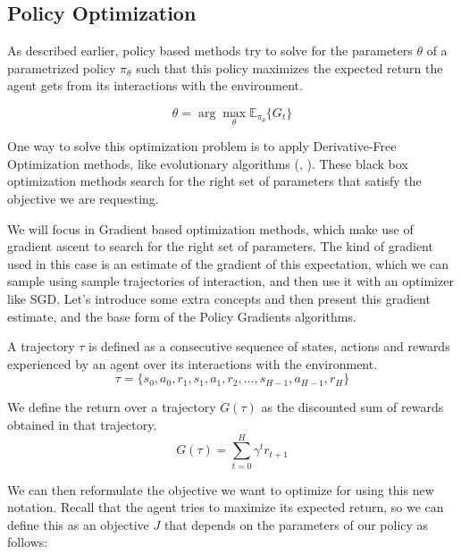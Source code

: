 \subsection{Policy Optimization}
\label{ref:subs:ch2:PolicyBasedMethods}

As described earlier, policy based methods try to solve for the parameters $\theta$
of a parametrized policy $\pi_{\theta}$ such that this policy maximizes the expected
return the agent gets from its interactions with the environment.

\begin{equation}
    \theta = \arg \max_\theta \mathbb{E}_{\pi_{\theta}} \lbrace G_{t} \rbrace
\end{equation}

One way to solve this optimization problem is to apply Derivative-Free Optimization
methods, like evolutionary algorithms (\citet{CMA}, \citet{ESopenai}). These black 
box optimization methods search for the right set of parameters that satisfy the 
objective we are requesting.

We will focus in Gradient based optimization methods, which make use of gradient
ascent to search for the right set of parameters. The kind of gradient used in this
case is an estimate of the gradient of this expectation, which we can sample
using sample trajectories of interaction, and then use it with an optimizer like
SGD. Let's introduce some extra concepts and then present this gradient estimate,
and the base form of the Policy Gradients algorithms.

\begin{definition}
    A trajectory $\tau$ is defined as a consecutive sequence of states, actions 
    and rewards experienced by an agent over its interactions with the environment.
    \begin{equation}
        \tau = \lbrace s_{0},a_{0},r_{1},s_{1},a_{1},r_{2},\hdots,s_{H-1},a_{H-1},r_{H} \rbrace
    \end{equation}
\end{definition}

\begin{definition}
    We define the return over a trajectory $G(\tau)$ as the discounted sum of
    rewards obtained in that trajectory.
    \begin{equation}
        G(\tau) = \sum_{t=0}^{H} \gamma^{t} r_{t+1}
    \end{equation}
\end{definition}

We  can then reformulate the objective we want to optimize for using this new notation.
Recall that the agent tries to maximize its expected return, so we can define this as
an objective $J$ that depends on the parameters of our policy as follows:

